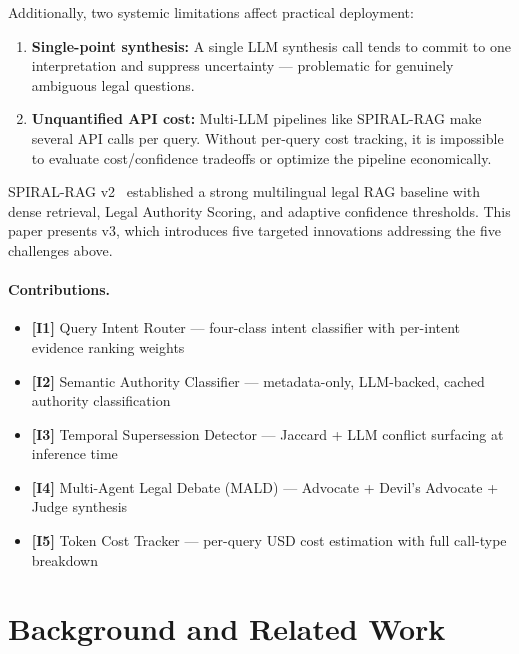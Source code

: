 \documentclass[12pt,a4paper]{article}
\begin{document}
Additionally, two systemic limitations affect practical deployment:

\begin{enumerate}[leftmargin=*,nosep,resume]
\item \textbf{Single-point synthesis:} A single LLM synthesis call tends to commit to one interpretation
and suppress uncertainty — problematic for genuinely ambiguous legal questions.
\item \textbf{Unquantified API cost:} Multi-LLM pipelines like SPIRAL-RAG make several API calls
per query. Without per-query cost tracking, it is impossible to evaluate cost/confidence
tradeoffs or optimize the pipeline economically.
\end{enumerate}

SPIRAL-RAG v2~\cite{spiral_v2} established a strong multilingual legal RAG baseline
with dense retrieval, Legal Authority Scoring, and adaptive confidence thresholds.
This paper presents v3, which introduces five targeted innovations addressing the
five challenges above.

\paragraph{Contributions.}
\begin{itemize}[leftmargin=*,nosep]
\item \textbf{[I1]} Query Intent Router — four-class intent classifier with per-intent evidence ranking weights
\item \textbf{[I2]} Semantic Authority Classifier — metadata-only, LLM-backed, cached authority classification
\item \textbf{[I3]} Temporal Supersession Detector — Jaccard + LLM conflict surfacing at inference time
\item \textbf{[I4]} Multi-Agent Legal Debate (MALD) — Advocate + Devil's Advocate + Judge synthesis
\item \textbf{[I5]} Token Cost Tracker — per-query USD cost estimation with full call-type breakdown
\end{itemize}

\section{Background and Related Work}
\label{sec:related}
\end{document}
